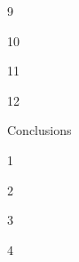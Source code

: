 \documentclass[fontsize=11pt]{scrartcl}
\begin{document}
\begin{multicols}{3}
\begin{center}
		\end{center}
		\begin{center}
		  \large{\textcolor{Sepia}{9}}
		\end{center}
		\begin{center}
		  \large{\textcolor{Sepia}{10}}
		\end{center}
		\begin{center}
		  \large{\textcolor{Sepia}{11}}
		\end{center}
		\begin{center}
		  \large{\textcolor{Sepia}{12}}
		\end{center}
		\begin{center}
		  \LARGE{\textcolor{OliveGreen}{Conclusions}}
		\end{center}
		\begin{center}
		  \large{\textcolor{OliveGreen}{1}}
		\end{center}
		\begin{center}
		  \large{\textcolor{OliveGreen}{2}}
		\end{center}
		\begin{center}
		  \large{\textcolor{OliveGreen}{3}}
		\end{center}
		\begin{center}
		  \large{\textcolor{OliveGreen}{4}}
		\end{center}
	\end{multicols}
\end{document}
